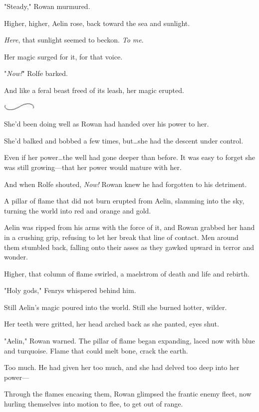 "Steady," Rowan murmured.

Higher, higher, Aelin rose, back toward the sea and sunlight.

\emph{Here}, that sunlight seemed to beckon.
\emph{To me}.

Her magic surged for it, for that voice.

"\emph{Now!}" Rolfe barked.

And like a feral beast freed of its leash, her magic erupted.

\begin{center}
	\includegraphics[width=0.65in,height=0.13in]{images/seperator}
\end{center}

She'd been doing well as Rowan had handed over his power to her.

She'd balked and bobbed a few times, but\ldots she had the descent under control.

Even if her power\ldots the well had gone deeper than before.
It was easy to forget she was still growing---that her power would mature with her.

And when Rolfe shouted, \emph{Now!} Rowan knew he had forgotten to his detriment.

A pillar of flame that did not burn erupted from Aelin, slamming into the sky, turning the world into red and orange and gold.

Aelin was ripped from his arms with the force of it, and Rowan grabbed her hand in a crushing grip, refusing to let her break that line of contact.
Men around them stumbled back, falling onto their asses as they gawked upward in terror and wonder.

Higher, that column of flame swirled, a maelstrom of death and life and rebirth.

"Holy gods," Fenrys whispered behind him.

Still Aelin's magic poured into the world.
Still she burned hotter, wilder.

Her teeth were gritted, her head arched back as she panted, eyes shut.

"Aelin," Rowan warned.
The pillar of flame began expanding, laced now with blue and turquoise.
Flame that could melt bone, crack the earth.

Too much.
He had given her too much, and she had delved too deep into her power---

Through the flames encasing them, Rowan glimpsed the frantic enemy fleet, now hurling themselves into motion to flee, to get out of range.

